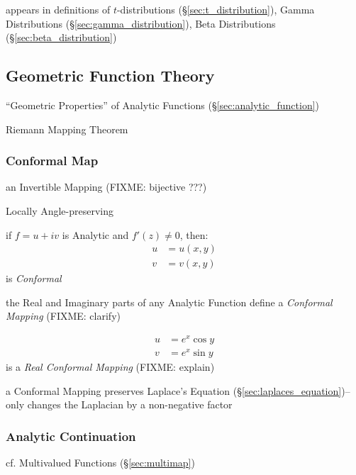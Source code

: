 appears in definitions of $t$-distributions (\S\ref{sec:t_distribution}), Gamma
Distributions (\S\ref{sec:gamma_distribution}), Beta Distributions
(\S\ref{sec:beta_distribution})



\subsection{Geometric Function Theory}\label{sec:geometric_function_theory}

``Geometric Properties'' of Analytic Functions (\S\ref{sec:analytic_function})

Riemann Mapping Theorem



\subsubsection{Conformal Map}\label{sec:conformal_map}

an Invertible Mapping (FIXME: bijective ???)

Locally Angle-preserving

if $f = u + iv$ is Analytic and $f'(z) \neq 0$, then:
\begin{align*}
  u & = u(x,y) \\
  v & = v(x,y)
\end{align*}
is \emph{Conformal}

the Real and Imaginary parts of any Analytic Function define a \emph{Conformal
  Mapping} (FIXME: clarify)

\begin{align*}
  u & = e^x \cos y \\
  v & = e^x \sin y
\end{align*}
is a \emph{Real Conformal Mapping} (FIXME: explain)

a Conformal Mapping preserves Laplace's Equation
(\S\ref{sec:laplaces_equation})-- only changes the Laplacian by a non-negative
factor



\subsubsection{Analytic Continuation}\label{sec:analytic_continuation}

cf. Multivalued Functions (\S\ref{sec:multimap})



